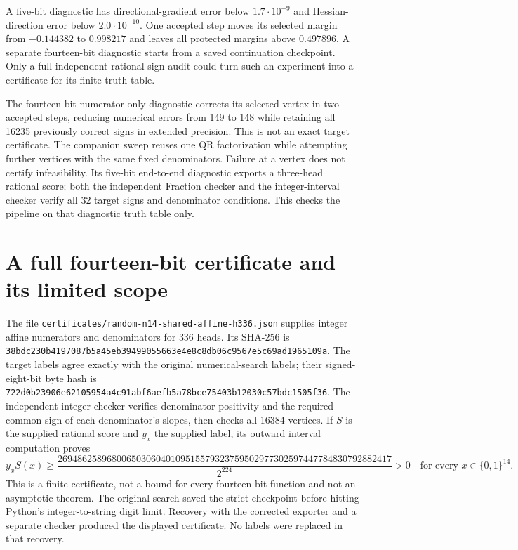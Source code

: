 \documentclass[11pt]{article}
\begin{document}
A five-bit diagnostic has directional-gradient error below
$1.7\cdot10^{-9}$ and Hessian-direction error below $2.0\cdot10^{-10}$.
One accepted step moves its selected margin from $-0.144382$ to
$0.998217$ and leaves all protected margins above $0.497896$.
A separate fourteen-bit diagnostic starts from a saved continuation
checkpoint. Only a full independent rational sign audit could turn such
an experiment into a certificate for its finite truth table.


The fourteen-bit numerator-only diagnostic corrects its selected vertex
in two accepted steps, reducing numerical errors from 149 to 148 while
retaining all 16235 previously correct signs in extended precision.
This is not an exact target certificate. The companion sweep reuses one
QR factorization while attempting further vertices with the same fixed
denominators. Failure at a vertex does not certify infeasibility.
Its five-bit end-to-end diagnostic exports a three-head rational score;
both the independent Fraction checker and the integer-interval checker
verify all 32 target signs and denominator conditions. This checks the
pipeline on that diagnostic truth table only.

\section{A full fourteen-bit certificate and its limited scope}

The file \texttt{certificates/random-n14-shared-affine-h336.json} supplies
integer affine numerators and denominators for 336 heads. Its SHA-256 is
\texttt{38bdc230b4197087b5a45eb39499055663e4e8c8db06c9567e5c69ad1965109a}.
The target labels agree exactly with the original numerical-search labels;
their signed-eight-bit byte hash is
\texttt{722d0b23906e62105954a4c91abf6aefb5a78bce75403b12030c57bdc1505f36}.
The independent integer checker verifies denominator positivity and the
required common sign of each denominator's slopes, then checks all 16384
vertices. If $S$ is the supplied rational score and $y_x$ the supplied label,
its outward interval computation proves
\[
 y_xS(x)\ge
 \frac{26948625896800650306040109515579323759502977302597447784830792882417}
 {2^{224}}>0
 \quad\text{for every }x\in\{0,1\}^{14}.
\]
This is a finite certificate, not a bound for every fourteen-bit function
and not an asymptotic theorem. The original search saved the strict
checkpoint before hitting Python's integer-to-string digit limit.
Recovery with the corrected exporter and a separate checker produced
the displayed certificate. No labels were replaced in that recovery.
\end{document}
